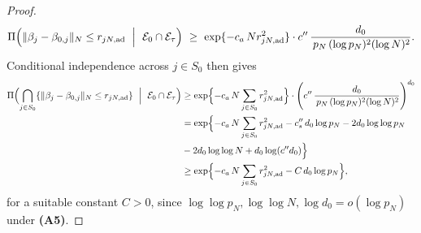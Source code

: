 \documentclass[11pt]{article}
\theoremstyle{plain}
\theoremstyle{definition}
\theoremstyle{plain}
\begin{document}
\begin{proof}
\begin{equation}\label{eq:active-one-new}
\Pi\Bigl(\|\beta_j-\beta_{0,j}\|_N\le r_{jN,\mathrm{ad}}\ \Bigm|\ \mathcal E_0\cap\mathcal E_\tau\Bigr)
\ \ge\ \exp\{-c_a\,N r_{jN,\mathrm{ad}}^2\}\cdot
c''\,\frac{d_0}{\,p_N\,(\log p_N)^2(\log N)^2}.
\end{equation}
Conditional independence across $j\in S_0$ then gives
\begin{align}
\Pi\Bigl(\bigcap_{j\in S_0}\{\|\beta_j-\beta_{0,j}\|_N\le r_{jN,\mathrm{ad}}\}\ \Bigm| \ \mathcal E_0\cap\mathcal E_\tau\Bigr)
&\ge \exp \Bigl\{-c_a\,N\sum_{j\in S_0} r_{jN,\mathrm{ad}}^2\Bigr\}\cdot
\Biggl(c''\,\frac{d_0}{\,p_N\,(\log p_N)^2(\log N)^2}\Biggr)^{d_0}\nonumber\\
&= \exp \Bigl\{-c_a\,N\sum_{j\in S_0} r_{jN,\mathrm{ad}}^2
- c_s''\,d_0\log p_N - 2d_0\log\log p_N \nonumber\\
& - 2d_0\log\log N + d_0\log(c''d_0)\Bigr\}\nonumber\\
&\ge \exp \Bigl\{-c_a\,N\sum_{j\in S_0} r_{jN,\mathrm{ad}}^2 - C\,d_0\log p_N\Bigr\},
\label{eq:actives-joint-new}
\end{align}
for a suitable constant $C>0$, since $\log\log p_N,\log\log N,\log d_0=o(\log p_N)$ under {\textbf{(A5)}}.



\end{proof}
\end{document}
